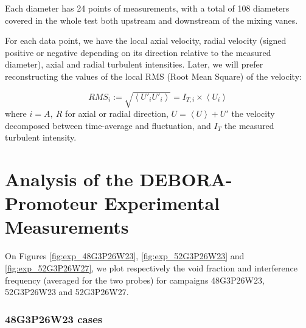 \npar



Each diameter has 24 points of measurements, with a total of 108 diameters covered in the whole test both upstream and downstream of the mixing vanes. 

\npar

For each data point, we have the local axial velocity, radial velocity (signed positive or negative depending on its direction relative to the measured diameter), axial and radial turbulent intensities. Later, we will prefer reconstructing the values of the local RMS (Root Mean Square) of the velocity:

\begin{equation}
RMS_{i} := \sqrt{\left<U'_{i}U'_{i}\right>} = I_{T,i} \times \left<U_{i}\right>
\end{equation}
where $i=A,\ R$ for axial or radial direction, $U=\left<U\right> + U'$ the velocity decomposed between time-average and fluctuation, and $I_{T}$ the measured turbulent intensity. 




\section{Analysis of the DEBORA-Promoteur Experimental Measurements}
\label{sec:deb_prom_anal}

On Figures \ref{fig:exp_48G3P26W23}, \ref{fig:exp_52G3P26W23} and \ref{fig:exp_52G3P26W27}, we plot respectively the void fraction and interference frequency (averaged for the two probes) for campaigns 48G3P26W23, 52G3P26W23 and 52G3P26W27.



\subsubsection{48G3P26W23 cases}


